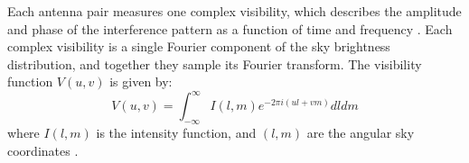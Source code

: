 Each antenna pair measures one complex visibility, which describes the amplitude and phase of the interference pattern as a function of time and frequency \citep{Ricci2017}.  Each complex visibility is a single Fourier component of the sky brightness distribution, and together they sample its Fourier transform. The visibility function  $V(u, v) $ is given by:
\begin{equation}
    V(u, v) = \int_{-\infty}^{\infty} I(l, m) e^{-2\pi i(ul + vm)} dl dm
    \label{eq: V(u,v)}
\end{equation}
\noindent where $I(l, m)$ is the intensity function, and $(l, m)$ are the angular sky coordinates  \citep{Marvil2026}. 






























 




